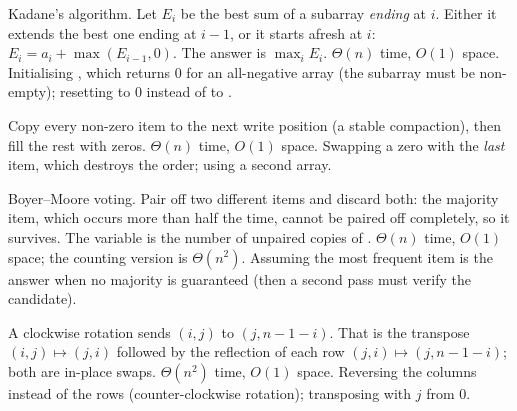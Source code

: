 \idea Kadane's algorithm. Let $E_i$ be the best sum of a subarray \emph{ending} at $i$.
Either it extends the best one ending at $i-1$, or it starts afresh at $i$:
$E_i=a_i+\max(E_{i-1},0)$. The answer is $\max_iE_i$.
\complexity $\Theta(n)$ time, $O(1)$ space.
\mistakes Initialising , which returns 0 for an all-negative array (the
subarray must be non-empty); resetting to 0 instead of to .

\idea Copy every non-zero item to the next write position (a stable compaction), then fill
the rest with zeros.
\complexity $\Theta(n)$ time, $O(1)$ space.
\mistakes Swapping a zero with the \emph{last} item, which destroys the order; using a
second array.

\idea Boyer--Moore voting. Pair off two different items and discard both: the majority
item, which occurs more than half the time, cannot be paired off completely, so it
survives. The variable  is the number of unpaired copies of .
\complexity $\Theta(n)$ time, $O(1)$ space; the counting version is $\Theta(n^2)$.
\mistakes Assuming the most frequent item is the answer when no majority is guaranteed
(then a second pass must verify the candidate).

\idea A clockwise rotation sends $(i,j)$ to $(j,n-1-i)$. That is the transpose
$(i,j)\mapsto(j,i)$ followed by the reflection of each row $(j,i)\mapsto(j,n-1-i)$; both
are in-place swaps.
\complexity $\Theta(n^2)$ time, $O(1)$ space.
\mistakes Reversing the columns instead of the rows (counter-clockwise rotation);
transposing with $j$ from 0.
